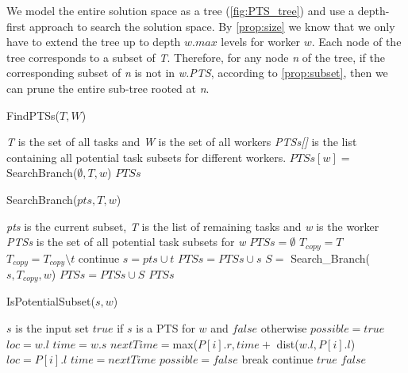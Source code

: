 We model the entire solution space as a tree (\cref{fig:PTS_tree}) and use a depth-first approach to search the solution space. By \cref{prop:size} we know that we only have to extend the tree up to depth $w.max$ levels for worker $w$. Each node of the tree corresponds to a subset of \emph{T}. Therefore, for any node \emph{n} of the tree, if the corresponding subset of \emph{n} is not in \emph{w.PTS}, according to \cref{prop:subset}, then we can prune the entire sub-tree rooted at \emph{n}.

\begin{algorithm}[h]
\caption{FindPTSs($T, W$)}
\label{algo:FindPTS}
\begin{algorithmic}[1]
\REQUIRE \emph{T} is the set of all tasks and \emph{W} is the set of all workers
\ENSURE \emph{PTSs[]} is the list containing all potential task subsets for different workers.
	\STATE $PTSs[w] = $ SearchBranch($\emptyset, T, w$)
\ENDFOR
\RETURN $PTSs$
\end{algorithmic}
\end{algorithm}

\begin{algorithm}[t]
\caption{SearchBranch($pts, T, w$)}
\label{algo:SearchBranch}
\begin{algorithmic}[1]
\REQUIRE \emph{pts} is the current subset, \emph{T} is the list of remaining tasks and \emph{w} is the worker
\ENSURE \emph{PTSs} is the set of all potential task subsets for \emph{w}
\STATE $PTSs = \emptyset$
\STATE $T_{copy} = T$
	\STATE $T_{copy} = T_{copy} \setminus t$
		\STATE continue
	\ENDIF
	\STATE $s = pts \cup t$
		\STATE $PTSs = PTSs \cup s$
			\STATE $S =$ Search\_Branch($s, T_{copy}, w$)
			\STATE $PTSs = PTSs \cup S$
		\ENDIF
	\ENDIF
\ENDFOR
\RETURN $PTSs$
\end{algorithmic}
\end{algorithm}

\begin{algorithm}[t]
\caption{IsPotentialSubset($s, w$)}
\label{algo:IsPTS}
\begin{algorithmic}[1]
\REQUIRE $s$ is the input set
\ENSURE $true$ if $s$ is a PTS for $w$ and $false$ otherwise
	\STATE $possible = true$
	\STATE $loc = w.l$
	\STATE $time = w.s$
		\STATE $nextTime = $max($P[i].r, time +$ dist($w.l, P[i].l$)
			\STATE $loc = P[i].l$
			\STATE $time = nextTime$
		\ELSE
			\STATE $possible = false$
			\STATE break
		\ENDIF
	\ENDFOR
		\STATE continue
	\ELSE
		\RETURN $true$
	\ENDIF
\ENDFOR
\RETURN $false$
\end{algorithmic}
\end{algorithm}


